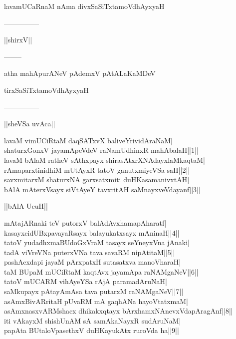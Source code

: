 \documentclass{article}
\begin{document}
\begin{center}
lavamUCaRnaM nAma divxSaSiTxtamoVdhAyxyaH
\end{center}

\begin{center}
---------------
\end{center}

\begin{center}
||shirxV||
\end{center}

\begin{center}
--------
\end{center}

\begin{center}
atha mahApurANeV pAdemxV pAtALaKaMDeV
\end{center}

\begin{center}
tirxSaSiTxtamoVdhAyxyaH
\end{center}

\begin{center}
---------------
\end{center}

\begin{center}
||sheVSa uvAca||
\end{center}

lavaM vimUCiRtaM daqSATxvX baliveYrividAraNaM|\\
shaturxGonxV jayamApeVdeV raNamUdhinxR mahAbalaH||1||\\
lavaM bAlaM ratheV sAthxpayx shirasAtxrXNAdayxlaMkaqtaM|\\
rAmaparxtinidhiM mUtAyxR tatoV ganutxmiyeVSa saH||2||\\
savxmitarxM shaturxNA garxsatxmiti duHKasamanivxtAH|\\
bAlA mAterxVsayx siVtAyeY tavxritAH saMnayxveVdayanf||3||\\

\begin{center}
||bAlA UcuH||
\end{center}

mAtajARnaki teV putorxV balAdAvxhamapAharatf|\\
kasayxcidUBxpavayaRsayx balayukatxsayx mAninaH||4||\\
tatoV yudadhxmaBUdoGxVraM tasayx  seYneyxVna jAnaki|\\
tadA viVreVNa puterxVNa tava savaRM nipAtitaM||5||\\
pashAcxdapi jayaM pArxpatxH sutasatxva manoVharaH|\\
taM BUpaM mUCiRtaM kaqtAvx jayamApa raNAMgaNeV||6||\\
tatoV mUCARM vihAyeYSa rAjA paramadAruNaH|\\
saMkupayx pAtayAmAsa tava putarxM raNAMgaNeV||7||\\
asAmxBivARritaH pUvaRM mA gaqhANa hayoVtatxmaM|\\
asAmxnasxvARMshacx dhikakxqtayx bArxhamxNAnevxVdapAragAnf||8||\\
iti vAkayxM shishUnAM sA samAkaNayxR sudAruNaM|\\
papAta BUtaloVpasethxV duHKayukAtx ruroVda ha||9||\\
\end{document}
